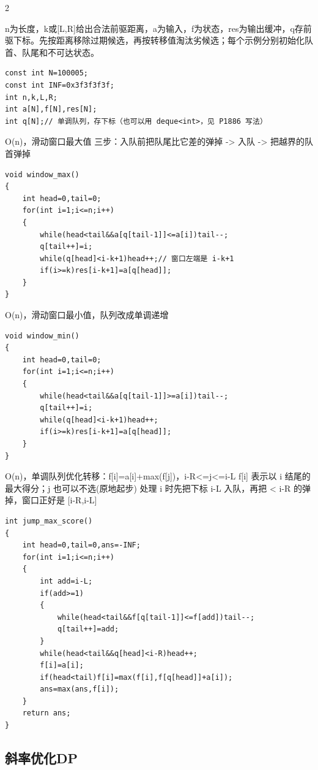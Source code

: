 \documentclass[UTF8,fontset=fandol,a4paper,twoside]{ctexart}
\newcommand{\note}[1]{{\fontsize{10}{12}\selectfont #1\par}}
\begin{document}
\begin{multicols}{2}
\note{n为长度，k或[\allowbreak{}L,\allowbreak{}R]\allowbreak{}给出合法前驱距离，a为输入，f为状态，res为输出缓冲，q存前驱下标。先按距离移除过期候选，再按转移值淘汰劣候选；每个示例分别初始化队首、队尾和不可达状态。}
\begin{lstlisting}
const int N=100005;
const int INF=0x3f3f3f3f;
int n,k,L,R;
int a[N],f[N],res[N];
int q[N];// 单调队列，存下标（也可以用 deque<int>，见 P1886 写法）
\end{lstlisting}
\note{O(\allowbreak{}n)\allowbreak{}，滑动窗口最大值 三步：入队前把队尾比它差的弹掉 -\allowbreak{}>\allowbreak{} 入队 -\allowbreak{}>\allowbreak{} 把越界的队首弹掉}
\begin{lstlisting}
void window_max()
{
    int head=0,tail=0;
    for(int i=1;i<=n;i++)
    {
        while(head<tail&&a[q[tail-1]]<=a[i])tail--;
        q[tail++]=i;
        while(q[head]<i-k+1)head++;// 窗口左端是 i-k+1
        if(i>=k)res[i-k+1]=a[q[head]];
    }
}
\end{lstlisting}
\note{O(\allowbreak{}n)\allowbreak{}，滑动窗口最小值，队列改成单调递增}
\begin{lstlisting}
void window_min()
{
    int head=0,tail=0;
    for(int i=1;i<=n;i++)
    {
        while(head<tail&&a[q[tail-1]]>=a[i])tail--;
        q[tail++]=i;
        while(q[head]<i-k+1)head++;
        if(i>=k)res[i-k+1]=a[q[head]];
    }
}
\end{lstlisting}
\note{O(\allowbreak{}n)\allowbreak{}，单调队列优化转移：f[\allowbreak{}i]\allowbreak{}=\allowbreak{}a[\allowbreak{}i]\allowbreak{}+\allowbreak{}max(\allowbreak{}f[\allowbreak{}j]\allowbreak{})\allowbreak{}，i-\allowbreak{}R<\allowbreak{}=\allowbreak{}j<\allowbreak{}=\allowbreak{}i-\allowbreak{}L f[\allowbreak{}i]\allowbreak{} 表示以 i 结尾的最大得分；j 也可以不选(\allowbreak{}原地起步)\allowbreak{} 处理 i 时先把下标 i-\allowbreak{}L 入队，再把 <\allowbreak{} i-\allowbreak{}R 的弹掉，窗口正好是 [\allowbreak{}i-\allowbreak{}R,\allowbreak{}i-\allowbreak{}L]\allowbreak{}}
\begin{lstlisting}
int jump_max_score()
{
    int head=0,tail=0,ans=-INF;
    for(int i=1;i<=n;i++)
    {
        int add=i-L;
        if(add>=1)
        {
            while(head<tail&&f[q[tail-1]]<=f[add])tail--;
            q[tail++]=add;
        }
        while(head<tail&&q[head]<i-R)head++;
        f[i]=a[i];
        if(head<tail)f[i]=max(f[i],f[q[head]]+a[i]);
        ans=max(ans,f[i]);
    }
    return ans;
}
\end{lstlisting}
\subsection{斜率优化DP}


\end{multicols}
\end{document}
